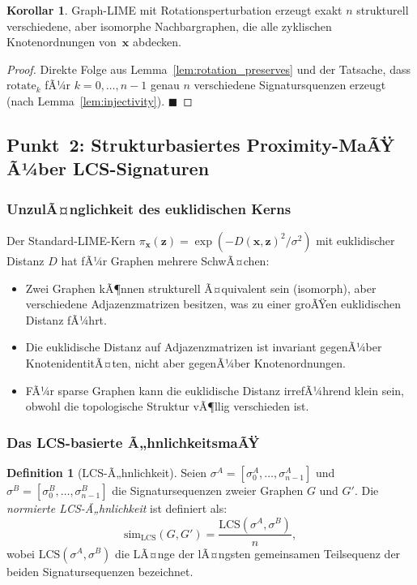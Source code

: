 ﻿\documentclass[a4paper,12pt]{article}
\theoremstyle{definition}
\newtheorem{definition}{Definition}[section]
\newtheorem{korollar}{Korollar}[section]
\begin{document}
\begin{korollar}
  Graph-LIME mit Rotationsperturbation erzeugt exakt $n$ strukturell verschiedene,
  aber isomorphe Nachbargraphen, die alle zyklischen Knotenordnungen von~$\mathbf{x}$
  abdecken.
\end{korollar}

\begin{proof}
  Direkte Folge aus Lemma~\ref{lem:rotation_preserves} und der Tatsache, dass
  $\mathrm{rotate}_k$ fÃ¼r $k = 0, \ldots, n-1$ genau $n$ verschiedene Signatursquenzen
  erzeugt (nach Lemma~\ref{lem:injectivity}). \hfill$\blacksquare$
\end{proof}

\subsection{Punkt~2: Strukturbasiertes Proximity-MaÃŸ Ã¼ber LCS-Signaturen}

\subsubsection{UnzulÃ¤nglichkeit des euklidischen Kerns}

Der Standard-LIME-Kern $\pi_\mathbf{x}(\mathbf{z}) = \exp(-D(\mathbf{x},\mathbf{z})^2/\sigma^2)$
mit euklidischer Distanz $D$ hat fÃ¼r Graphen mehrere SchwÃ¤chen:
\begin{itemize}
  \item Zwei Graphen kÃ¶nnen strukturell Ã¤quivalent sein (isomorph), aber
        verschiedene Adjazenzmatrizen besitzen, was zu einer groÃŸen euklidischen
        Distanz fÃ¼hrt.
  \item Die euklidische Distanz auf Adjazenzmatrizen ist invariant gegenÃ¼ber
        KnotenidentitÃ¤ten, nicht aber gegenÃ¼ber Knotenordnungen.
  \item FÃ¼r sparse Graphen kann die euklidische Distanz irrefÃ¼hrend klein sein,
        obwohl die topologische Struktur vÃ¶llig verschieden ist.
\end{itemize}

\subsubsection{Das LCS-basierte Ã„hnlichkeitsmaÃŸ}

\begin{definition}[LCS-Ã„hnlichkeit]
  Seien $\sigma^A = [\sigma_0^A, \ldots, \sigma_{n-1}^A]$ und
  $\sigma^B = [\sigma_0^B, \ldots, \sigma_{n-1}^B]$ die Signatursequenzen zweier
  Graphen $G$ und $G'$.
  Die \emph{normierte LCS-Ã„hnlichkeit} ist definiert als:
  \begin{equation}
    \mathrm{sim}_{\mathrm{LCS}}(G, G')
    = \frac{\mathrm{LCS}(\sigma^A, \sigma^B)}{n},
    \label{eq:lcs_sim}
  \end{equation}
  wobei $\mathrm{LCS}(\sigma^A, \sigma^B)$ die LÃ¤nge der lÃ¤ngsten gemeinsamen
  Teilsequenz der beiden Signatursequenzen bezeichnet.
\end{definition}
\end{document}
